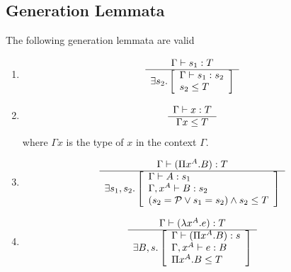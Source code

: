 \subsection{Generation Lemmata}



\begin{theorem}
    \label{GenerationLemma}
    The following generation lemmata are valid
    \begin{enumerate}
    \item
        $$
        \begin{array}{c} 
            \Gamma \vdash s_1 : T
         \\ \hline 
            \exists
                s_2.
                \left[
                \begin{array}{l}
                    \Gamma \vdash s_1: s_2
                    \\
                    s_2 \le T
                \end{array}
                \right]
        \end{array}
        $$

    \item
        $$
        \begin{array}{c} 
            \Gamma \vdash x : T
         \\ \hline 
            \Gamma x \le T
        \end{array}
        $$
        where $\Gamma x$ is the type of $x$ in the context $\Gamma$.

    \item %
        $$
        \begin{array}{c} 
            \Gamma \vdash (\Pi x^A. B) : T
         \\ \hline 
            \exists
                s_1, s_2.
                \left[
                \begin{array}{l}
                    \Gamma \vdash A: s_1
                    \\
                    \Gamma, x^A \vdash B: s_2
                    \\
                    (s_2 = {\cal P} \lor s_1 = s_2) \land s_2 \le T
                \end{array}
                \right]
        \end{array}
        $$

    \item %
        $$
        \begin{array}{c} 
            \Gamma \vdash (\lambda x^A. e) : T
         \\ \hline 
            \exists
                B, s.
                \left[
                \begin{array}{l}
                    \Gamma \vdash (\Pi x^A. B): s
                    \\
                    \Gamma, x^A \vdash e: B
                    \\
                    \Pi x^A.B \le T
                \end{array}
                \right]
        \end{array}
        $$


\end{enumerate}
\end{theorem}
